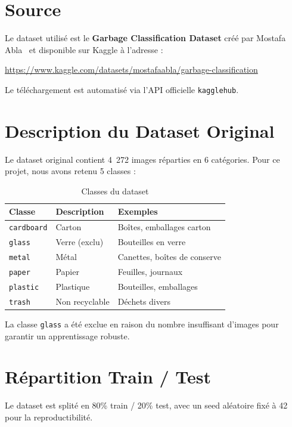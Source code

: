 \documentclass[12pt,a4paper]{report}
\begin{document}
\section{Source}
Le dataset utilisé est le \textbf{Garbage Classification Dataset} créé par Mostafa Abla~\cite{mostafa2020} et disponible sur Kaggle à l'adresse :
\begin{center}
\url{https://www.kaggle.com/datasets/mostafaabla/garbage-classification}
\end{center}
Le téléchargement est automatisé via l'API officielle \texttt{kagglehub}.

\section{Description du Dataset Original}
Le dataset original contient 4~272 images réparties en 6 catégories. Pour ce projet, nous avons retenu 5 classes :

\begin{table}[H]
    \centering
    \caption{Classes du dataset}
    \label{tab:classes}
    \begin{tabular}{lll}
        \toprule
        \textbf{Classe} & \textbf{Description} & \textbf{Exemples} \\
        \midrule
        \texttt{cardboard} & Carton & Boîtes, emballages carton \\
        \texttt{glass} & Verre (exclu) & Bouteilles en verre \\
        \texttt{metal} & Métal & Canettes, boîtes de conserve \\
        \texttt{paper} & Papier & Feuilles, journaux \\
        \texttt{plastic} & Plastique & Bouteilles, emballages \\
        \texttt{trash} & Non recyclable & Déchets divers \\
        \bottomrule
    \end{tabular}
\end{table}

La classe \texttt{glass} a été exclue en raison du nombre insuffisant d'images pour garantir un apprentissage robuste.

\section{Répartition Train / Test}
Le dataset est splité en 80\% train / 20\% test, avec un seed aléatoire fixé à 42 pour la reproductibilité.
\end{document}
